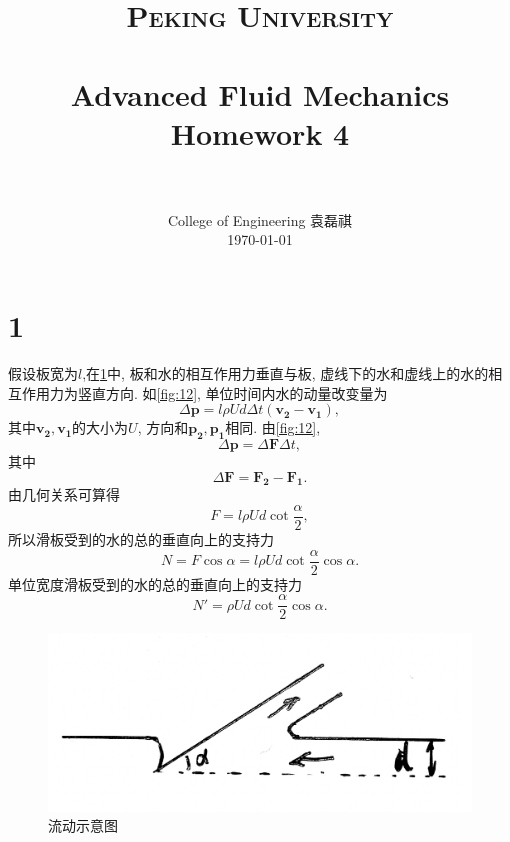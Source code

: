 \documentclass[12pt]{article}
\title{
		\vspace{-1in} 	
		\usefont{OT1}{bch}{b}{n}
		\normalfont \normalsize \textsc{\LARGE Peking University}\\[1cm] %
		\horrule{0.5pt} \\[0.5cm]
		\huge \bfseries{Advanced Fluid Mechanics Homework 4} \\
		\horrule{2pt} \\[0.5cm]
}
\author{
		\normalfont 								\normalsize
		College of Engineering \quad 2001111690  \quad 袁磊祺\\	\normalsize
        \today
}
\date{}
\begin{document}


\maketitle

\section{1}

假设板宽为$l$,在\cref{fig:11}中, 板和水的相互作用力垂直与板, 虚线下的水和虚线上的水的相互作用力为竖直方向. 如\cref{fig:12}, 单位时间内水的动量改变量为
\begin{equation}
	\Delta \bm{p} = l\rho U d \Delta t (\bm{v_2}-\bm{v_1}),
\end{equation}
其中$\bm{v_2},\bm{v_1}$的大小为$U$, 方向和$\bm{p_2},\bm{p_1}$相同. 
由\cref{fig:12},
\begin{equation}
	\Delta \bm{p} = \Delta \bm{F}  \Delta t,
\end{equation}
其中
\begin{equation}
	\Delta \bm{F} = \bm{F_2} - \bm{F_1}.
\end{equation}
由几何关系可算得
\begin{equation}
	F = l\rho U d \cot \frac{\alpha}{2},
\end{equation}
所以滑板受到的水的总的垂直向上的支持力
\begin{equation}
	N = F \cos \alpha = l\rho U d \cot \frac{\alpha}{2} \cos \alpha.
\end{equation}
单位宽度滑板受到的水的总的垂直向上的支持力
\begin{equation}
	N' = \rho U d \cot \frac{\alpha}{2} \cos \alpha.
\end{equation}

\begin{figure}[htp]
	\centering
	\includegraphics[width=12cm]{11.png}
	\caption{流动示意图}
	\label{fig:11}
\end{figure}
\end{document}
